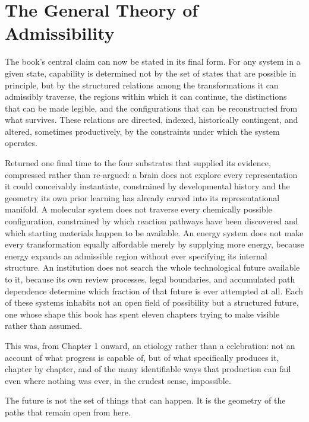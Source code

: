 \documentclass[11pt]{book}
\begin{document}
\section{The General Theory of Admissibility}

The book's central claim can now be stated in its final form. For any system in a given state, capability is determined not by the set of states that are possible in principle, but by the structured relations among the transformations it can admissibly traverse, the regions within which it can continue, the distinctions that can be made legible, and the configurations that can be reconstructed from what survives. These relations are directed, indexed, historically contingent, and altered, sometimes productively, by the constraints under which the system operates.

Returned one final time to the four substrates that supplied its evidence, compressed rather than re-argued: a brain does not explore every representation it could conceivably instantiate, constrained by developmental history and the geometry its own prior learning has already carved into its representational manifold. A molecular system does not traverse every chemically possible configuration, constrained by which reaction pathways have been discovered and which starting materials happen to be available. An energy system does not make every transformation equally affordable merely by supplying more energy, because energy expands an admissible region without ever specifying its internal structure. An institution does not search the whole technological future available to it, because its own review processes, legal boundaries, and accumulated path dependence determine which fraction of that future is ever attempted at all. Each of these systems inhabits not an open field of possibility but a structured future, one whose shape this book has spent eleven chapters trying to make visible rather than assumed.

This was, from Chapter 1 onward, an etiology rather than a celebration: not an account of what progress is capable of, but of what specifically produces it, chapter by chapter, and of the many identifiable ways that production can fail even where nothing was ever, in the crudest sense, impossible.

The future is not the set of things that can happen. It is the geometry of the paths that remain open from here.
\end{document}
